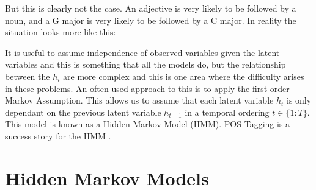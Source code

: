\documentclass[bsc,singlespacing,logo, parskip, deptreport]{infthesis}
\begin{document}
But this is clearly not the case. An adjective is very likely to be followed by a noun, and a G major is very likely to be followed by a C major. In reality the situation looks more like this:

\begin{center}
\end{center}

It is useful to assume independence of observed variables given the latent variables and this is something that all the models do, but the relationship between the $h_i$ are more complex and this is one area where the difficulty arises in these problems. An often used approach to this is to apply the first-order Markov Assumption. This allows us to assume that each latent variable $h_t$ is only dependant on the previous latent variable $h_{t-1}$ in a temporal ordering $t \in \{1:T\}$. This model is known as a Hidden Markov Model (HMM). POS Tagging is a success story for the HMM \cite{kupiec1992robust}. 

\begin{center}
\end{center}

\section{Hidden Markov Models}
\end{document}
